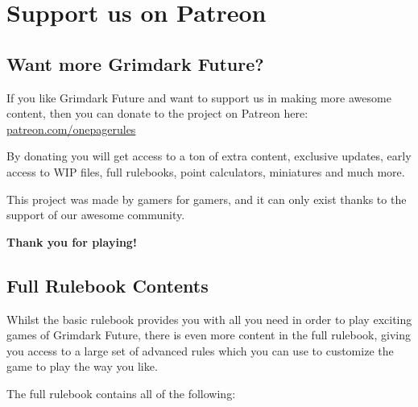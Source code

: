 \documentclass[9pt, a4paper]{extarticle}            %
\begin{document}
\newpage



\section{Support us on Patreon}

\begin{multicols}{2}

\subsection{Want more Grimdark Future?}

If you like Grimdark Future and want to support us in making more awesome content, then you can donate to the project on Patreon here: \href{http://patreon.com/onepagerules}{patreon.com/onepagerules}

By donating you will get access to a ton of extra content, exclusive updates, early access to WIP files, full rulebooks, point calculators, miniatures and much more.

This project was made by gamers for gamers, and it can only exist thanks to the support of our awesome community.

\textbf{Thank you for playing!}

\vfill\null

\columnbreak

\subsection{Full Rulebook Contents}

Whilst the basic rulebook provides you with all you need in order to play exciting games of Grimdark Future, there is even more content in the full rulebook, giving you access to a large set of advanced rules which you can use to customize the game to play the way you like.

The full rulebook contains all of the following:



\end{multicols}
\end{document}
